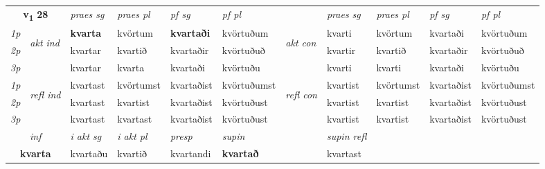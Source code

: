 \noindent
\begin{tabular}{lllllllllll} \toprule
\multicolumn{2}{c}{\textbf{v{\textsubscript{1}}} \Large{\textbf{28}}}  &  \textit{praes sg}  & \textit{praes pl}  &\textit{ pf sg} & \textit{pf pl} &  &  \textit{praes sg}  & \textit{praes pl}  & \textit{pf sg} & \textit{pf pl } \\*
	\cmidrule{3-6} \cmidrule{8-11}
 {\textit{1p}} & \multirow{3}{*}{\begin{turn}{90}\textit{akt ind}\end{turn}} & \textbf{kvarta} & kvörtum & \textbf{kvartaði} & kvörtuðum & \multirow{3}{*}{\begin{turn}{90}\textit{akt con}\end{turn}} &kvarti & kvörtum & kvartaði & kvörtuðum\\*
 {\textit{2p}} &  &  kvartar  & kvartið & kvartaðir & kvörtuðuð & & kvartir & kvartið & kvartaðir & kvörtuðuð \\*
{\textit{3p}} &  & kvartar & kvarta & kvartaði & kvörtuðu & & kvarti & kvarti& kvartaði & kvörtuðu \\*
\cmidrule{3-6} \cmidrule{8-11}
 {\textit{1p}} & \multirow{3}{*}{\begin{turn}{90}\textit{refl ind}\end{turn}}  & kvartast & kvörtumst & kvartaðist & kvörtuðumst & \multirow{3}{*}{\begin{turn}{90}\textit{refl con}\end{turn}}  &kvartist & kvörtumst & kvartaðist & kvörtuðumst \\*
 {\textit{2p}} &  & kvartast & kvartist & kvartaðist & kvörtuðust & &kvartist & kvartist & kvartaðist & kvörtuðust \\*
 {\textit{3p}}  & & kvartast & kvartast & kvartaðist & kvörtuðust & & kvartist & kvartist& kvartaðist & kvörtuðust \\*
\cmidrule{3-6} \cmidrule{8-11}

   \multicolumn{2}{c}{\textit{inf}}  & \textit{i akt sg} & \textit{i akt pl}   & \textit{presp} & \textit{supin} && \textit{supin refl}  \\*
  \multicolumn{2}{c}{\textbf{kvarta}} & kvartaðu  & kvartið   & kvartandi &  \textbf{kvartað} && kvartast  \\*
\end{tabular}

